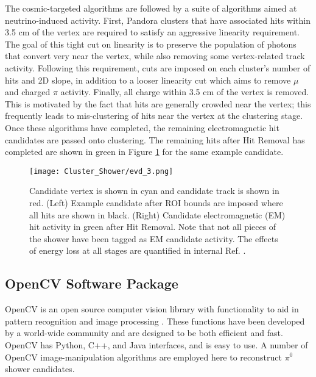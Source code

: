 \par The cosmic-targeted algorithms are followed by a suite of algorithms aimed at neutrino-induced activity. First, Pandora clusters that have associated hits within 3.5 cm of the vertex are required to satisfy an aggressive linearity requirement. The goal of this tight cut on linearity is to preserve the population of photons that convert very near the vertex, while also removing some vertex-related track activity. Following this requirement, cuts are imposed on each cluster's number of hits and 2D slope, in addition to a looser linearity cut which aims to remove $\mu$ and charged $\pi$ activity. Finally, all charge within 3.5 cm of the vertex is removed. This is motivated by the fact that hits are generally crowded near the vertex; this frequently leads to mis-clustering of hits near the vertex at the clustering stage. Once these algorithms have completed, the remaining electromagnetic hit candidates are passed onto clustering. The remaining hits after Hit Removal has completed are shown in green in Figure \ref{fig:hitremoval} for the same example candidate. 

\begin{figure}[h!]
\centering
\texttt{[image: Cluster\_Shower/evd\_3.png]}
\caption{ Candidate vertex is shown in cyan and candidate track is shown in red. (Left) Example candidate after ROI bounds are imposed where all hits are shown in black.  (Right) Candidate electromagnetic (EM) hit activity in green after Hit Removal. Note that not all pieces of the shower have been tagged as EM candidate activity. The effects of energy loss at all stages are quantified in internal Ref. \cite{bib:davidc_missingE}.} 
\label{fig:hitremoval}
\end{figure}

\subsection{OpenCV Software Package}
OpenCV is an open source computer vision library with functionality to aid in pattern recognition and image processing \cite{bib:opencv}. These functions have been developed by a world-wide community and are designed to be both efficient and fast. OpenCV has Python, C++, and Java interfaces, and is easy to use. A number of OpenCV image-manipulation algorithms are employed here to reconstruct $\pi^0$ shower candidates.  

